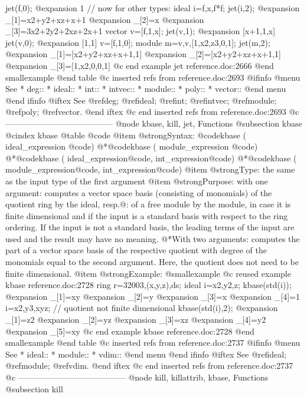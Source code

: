 {  jet(f,0);
@expansion{} 1
  // now for other types:
  ideal i=f,x,f*f;
  jet(i,2);
@expansion{} _[1]=x2+y2+xz+x+1
@expansion{} _[2]=x
@expansion{} _[3]=3x2+2y2+2xz+2x+1
  vector v=[f,1,x];
  jet(v,1);
@expansion{} [x+1,1,x]
  jet(v,0);
@expansion{} [1,1]
  v=[f,1,0];
  module m=v,v,[1,x2,z3,0,1];
  jet(m,2);
@expansion{} _[1]=[x2+y2+xz+x+1,1]
@expansion{} _[2]=[x2+y2+xz+x+1,1]
@expansion{} _[3]=[1,x2,0,0,1]
@c end example jet reference.doc:2666
@end smallexample
@end table
@c inserted refs from reference.doc:2693
@ifinfo
@menu
See
* deg::
* ideal::
* int::
* intvec::
* module::
* poly::
* vector::
@end menu
@end ifinfo
@iftex
See
@ref{deg};
@ref{ideal};
@ref{int};
@ref{intvec};
@ref{module};
@ref{poly};
@ref{vector}.
@end iftex
@c end inserted refs from reference.doc:2693
@c ---------------------------------------
@node kbase, kill, jet, Functions
@subsection kbase
@cindex kbase
@table @code
@item @strong{Syntax:}
@code{kbase (} ideal_expression @code{)}
@*@code{kbase (} module_expression @code{)}
@*@code{kbase (} ideal_expression@code{,} int_expression@code{)}
@*@code{kbase (} module_expression@code{,} int_expression@code{)}
@item @strong{Type:}
the same as the input type of the first argument
@item @strong{Purpose:}
with one argument:
computes a vector space basis (consisting of monomials)
of the quotient ring by the ideal,
resp.@: of a free module by the module, in case it is finite dimensional
and if the input is a standard basis with respect to the ring ordering.
If the input is not a standard basis, the leading terms of the input are
used and the result may have no meaning.
@*With two arguments: computes the part of a vector space basis of the
respective quotient with degree of the monomials equal to the
second argument. Here, the quotient does not need to be finite dimensional.
@item @strong{Example:}
@smallexample
@c reused example kbase reference.doc:2728 
  ring r=32003,(x,y,z),ds;
  ideal i=x2,y2,z;
  kbase(std(i));
@expansion{} _[1]=xy
@expansion{} _[2]=y
@expansion{} _[3]=x
@expansion{} _[4]=1
  i=x2,y3,xyz;  // quotient not finite dimensional
  kbase(std(i),2);
@expansion{} _[1]=z2
@expansion{} _[2]=yz
@expansion{} _[3]=xz
@expansion{} _[4]=y2
@expansion{} _[5]=xy
@c end example kbase reference.doc:2728
@end smallexample
@end table
@c inserted refs from reference.doc:2737
@ifinfo
@menu
See
* ideal::
* module::
* vdim::
@end menu
@end ifinfo
@iftex
See
@ref{ideal};
@ref{module};
@ref{vdim}.
@end iftex
@c end inserted refs from reference.doc:2737
@c ---------------------------------------
@node kill, killattrib, kbase, Functions
@subsection kill
}
